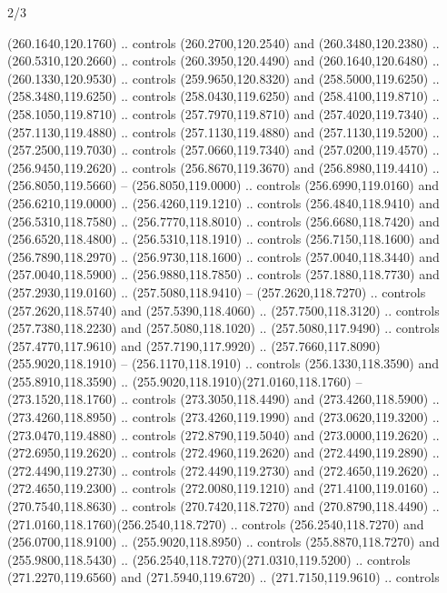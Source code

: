 \begin{flagdescription}{2/3}
\begin{scope}[xshift=0.5\flaglength,yshift=0.5\flagwidth,scale=\flagwidth/259.2]
\begin{scope}[y=0.8pt, x=0.8pt, yscale=-1,shift={(-243,-162)}]
      (260.1640,120.1760) .. controls (260.2700,120.2540) and (260.3480,120.2380) ..
      (260.5310,120.2660) .. controls (260.3950,120.4490) and (260.1640,120.6480) ..
      (260.1330,120.9530) .. controls (259.9650,120.8320) and (258.5000,119.6250) ..
      (258.3480,119.6250) .. controls (258.0430,119.6250) and (258.4100,119.8710) ..
      (258.1050,119.8710) .. controls (257.7970,119.8710) and (257.4020,119.7340) ..
      (257.1130,119.4880) .. controls (257.1130,119.4880) and (257.1130,119.5200) ..
      (257.2500,119.7030) .. controls (257.0660,119.7340) and (257.0200,119.4570) ..
      (256.9450,119.2620) .. controls (256.8670,119.3670) and (256.8980,119.4410) ..
      (256.8050,119.5660) -- (256.8050,119.0000) .. controls (256.6990,119.0160) and
      (256.6210,119.0000) .. (256.4260,119.1210) .. controls (256.4840,118.9410) and
      (256.5310,118.7580) .. (256.7770,118.8010) .. controls (256.6680,118.7420) and
      (256.6520,118.4800) .. (256.5310,118.1910) .. controls (256.7150,118.1600) and
      (256.7890,118.2970) .. (256.9730,118.1600) .. controls (257.0040,118.3440) and
      (257.0040,118.5900) .. (256.9880,118.7850) .. controls (257.1880,118.7730) and
      (257.2930,119.0160) .. (257.5080,118.9410) -- (257.2620,118.7270) .. controls
      (257.2620,118.5740) and (257.5390,118.4060) .. (257.7500,118.3120) .. controls
      (257.7380,118.2230) and (257.5080,118.1020) .. (257.5080,117.9490) .. controls
      (257.4770,117.9610) and (257.7190,117.9920) ..
      (257.7660,117.8090)(255.9020,118.1910) -- (256.1170,118.1910) .. controls
      (256.1330,118.3590) and (255.8910,118.3590) ..
      (255.9020,118.1910)(271.0160,118.1760) -- (273.1520,118.1760) .. controls
      (273.3050,118.4490) and (273.4260,118.5900) .. (273.4260,118.8950) .. controls
      (273.4260,119.1990) and (273.0620,119.3200) .. (273.0470,119.4880) .. controls
      (272.8790,119.5040) and (273.0000,119.2620) .. (272.6950,119.2620) .. controls
      (272.4960,119.2620) and (272.4490,119.2890) .. (272.4490,119.2730) .. controls
      (272.4490,119.2730) and (272.4650,119.2620) .. (272.4650,119.2300) .. controls
      (272.0080,119.1210) and (271.4100,119.0160) .. (270.7540,118.8630) .. controls
      (270.7420,118.7270) and (270.8790,118.4490) ..
      (271.0160,118.1760)(256.2540,118.7270) .. controls (256.2540,118.7270) and
      (256.0700,118.9100) .. (255.9020,118.8950) .. controls (255.8870,118.7270) and
      (255.9800,118.5430) .. (256.2540,118.7270)(271.0310,119.5200) .. controls
      (271.2270,119.6560) and (271.5940,119.6720) .. (271.7150,119.9610) .. controls

\end{scope}
\end{scope}
\end{flagdescription}

